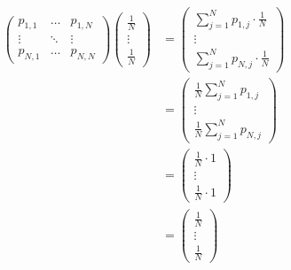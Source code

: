 \documentclass[10pt,a4paper,parskip=half]{scrartcl}
\begin{document}
\begin{enumerate}
\begin{align*}
\begin{pmatrix} p_{1,1} & \dots & p_{1,N} \\ \vdots & \ddots & \vdots \\ p_{N,1} & \dots & p_{N,N} \end{pmatrix}\begin{pmatrix} \frac 1 N \\ \vdots \\ \frac 1 N \end{pmatrix} &= \begin{pmatrix} \sum_{j=1}^{N} p_{1,j} \cdot \frac 1 N \\ \vdots \\ \sum_{j=1}^{N} p_{N,j} \cdot \frac 1 N \end{pmatrix} \\
&= \begin{pmatrix} \frac 1 N \sum_{j=1}^{N} p_{1,j} \\ \vdots \\ \frac 1 N \sum_{j=1}^{N} p_{N,j} \end{pmatrix}\\
&= \begin{pmatrix} \frac 1 N \cdot 1 \\ \vdots \\ \frac 1 N \cdot 1 \end{pmatrix}
\\
&= \begin{pmatrix} \frac 1 N \\ \vdots \\ \frac 1 N \end{pmatrix}
\end{align*}

\end{enumerate}
\end{document}
